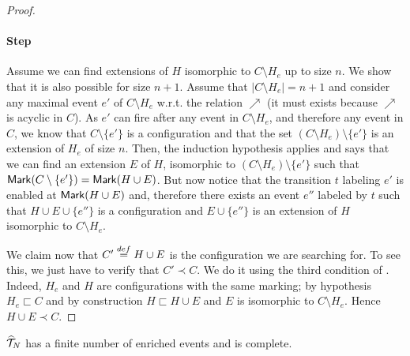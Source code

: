 \begin{proof}
\paragraph{Step}  Assume we can find extensions of $H$ isomorphic to $C
\setminus H_e$ up to size $n$.  We show that it is also possible for size
$n+1$.  Assume that $|C \setminus H_e| = n + 1$ and consider any maximal event
$e'$ of $C \setminus H_e$ w.r.t. the relation $\nearrow$ (it must exists
because $\nearrow$ is acyclic in $C$).  As $e'$ can fire after any event in $C
\setminus H_e$, and therefore any event in $C$, we know that $C \setminus
\{e'\}$ is a configuration and that the set $(C \setminus H_e) \setminus
\{e'\}$ is an extension of $H_e$ of size $n$.  Then, the induction hypothesis
applies and says that we can find an extension $E$ of $H$, isomorphic to $(C
\setminus H_e) \setminus \{e'\}$ such that $\mathsf{Mark }{(C \setminus \{e'\})} =
\mathsf{Mark }{(H \cup E)}$.  But now notice that the transition $t$ labeling $e'$ is
enabled at $\mathsf{Mark }{(H \cup E)}$ and, therefore there exists an event $e''$
labeled by $t$ such that $H \cup E \cup \{e''\}$ is a configuration and $E \cup
\{e''\}$ is an extension of $H$ isomorphic to $C \setminus H_e$.

We claim now that $C' \stackrel{def}{=} H \cup E$ is the configuration we are searching
for.  To see this, we just have to verify that $C' \prec C$.  We do it using
the third condition of .  Indeed, $H_e$ and $H$ are
configurations with the same marking; by hypothesis $H_e \sqsubset C$ and by
construction $H \sqsubset H \cup E$ and $E$ is isomorphic to $C \setminus H_e$.
Hence $H \cup E \prec C$.
\end{proof}

\setcounter{theorem}{15}
\begin{theorem}
$\widehat{\mathcal{T}}_{N}$ has a finite number of enriched events and is complete.
\end{theorem}

